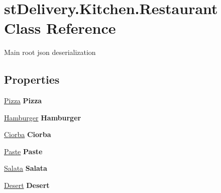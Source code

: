 \hypertarget{classst_delivery_1_1_kitchen_1_1_restaurant}{}\section{st\+Delivery.\+Kitchen.\+Restaurant Class Reference}
\label{classst_delivery_1_1_kitchen_1_1_restaurant}


Main root json deserialization  


\subsection*{Properties}
\begin{DoxyCompactItemize}
\item 
\mbox{\label{classst_delivery_1_1_kitchen_1_1_restaurant_a5f4c8a61ce0d01b41e92446c90fc9117}} 
\hyperlink{classst_delivery_1_1_kitchen_1_1_pizza}{Pizza} {\bfseries Pizza}
\item 
\mbox{\label{classst_delivery_1_1_kitchen_1_1_restaurant_af5f3b76bb74915a6761bbde801fbdb39}} 
\hyperlink{classst_delivery_1_1_kitchen_1_1_hamburger}{Hamburger} {\bfseries Hamburger}
\item 
\mbox{\label{classst_delivery_1_1_kitchen_1_1_restaurant_a62faf42c2b0a98b364e4215570306be7}} 
\hyperlink{classst_delivery_1_1_kitchen_1_1_ciorba}{Ciorba} {\bfseries Ciorba}
\item 
\mbox{\label{classst_delivery_1_1_kitchen_1_1_restaurant_a35482a437340310bebda2921f2b74bfb}} 
\hyperlink{classst_delivery_1_1_kitchen_1_1_paste}{Paste} {\bfseries Paste}
\item 
\mbox{\label{classst_delivery_1_1_kitchen_1_1_restaurant_a9845096975a90399f1e5df025ce7d89c}} 
\hyperlink{classst_delivery_1_1_kitchen_1_1_salata}{Salata} {\bfseries Salata}
\item 
\mbox{\label{classst_delivery_1_1_kitchen_1_1_restaurant_ae9d9fc148f38940a3ccc5529b7c855c9}} 
\hyperlink{classst_delivery_1_1_kitchen_1_1_desert}{Desert} {\bfseries Desert}
\end{DoxyCompactItemize}


